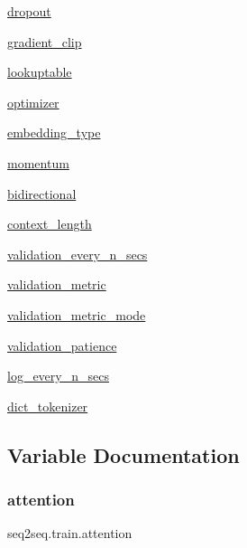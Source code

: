 \begin{DoxyCompactItemize}
\hyperlink{namespaceseq2seq_1_1train_a6ce0f888cec4261959cc61cc80a5cfd4}{dropout}
\item 
\hyperlink{namespaceseq2seq_1_1train_ac8c6c64d90fd2d682a86cdbd893dd895}{gradient\+\_\+clip}
\item 
\hyperlink{namespaceseq2seq_1_1train_a49f7da1b71bd20017774f8c6b8884676}{lookuptable}
\item 
\hyperlink{namespaceseq2seq_1_1train_ab303e1582310ef62604d70c938bfe563}{optimizer}
\item 
\hyperlink{namespaceseq2seq_1_1train_ae607c209cdec45923aaeef6318debcf2}{embedding\+\_\+type}
\item 
\hyperlink{namespaceseq2seq_1_1train_a1714428a81ed90a740bde11d172768ea}{momentum}
\item 
\hyperlink{namespaceseq2seq_1_1train_a84bf6d2d896ec47ce289872a962a71f8}{bidirectional}
\item 
\hyperlink{namespaceseq2seq_1_1train_affd05b2237eb3f4e203a59be06cfc14d}{context\+\_\+length}
\item 
\hyperlink{namespaceseq2seq_1_1train_ad886940ebda001e78047c43e99838fe8}{validation\+\_\+every\+\_\+n\+\_\+secs}
\item 
\hyperlink{namespaceseq2seq_1_1train_a4cb6f12de71de9753db0e582aa95b55c}{validation\+\_\+metric}
\item 
\hyperlink{namespaceseq2seq_1_1train_a06e04c7f720b926c72043de45d55587b}{validation\+\_\+metric\+\_\+mode}
\item 
\hyperlink{namespaceseq2seq_1_1train_aaa30160a61d83c6432812a34488992ee}{validation\+\_\+patience}
\item 
\hyperlink{namespaceseq2seq_1_1train_ace1af0772a478f538d5156ce5758a73a}{log\+\_\+every\+\_\+n\+\_\+secs}
\item 
\hyperlink{namespaceseq2seq_1_1train_a6473fc025953ca7d5207631fd967d865}{dict\+\_\+tokenizer}
\end{DoxyCompactItemize}


\subsection{Variable Documentation}
\mbox{\label{namespaceseq2seq_1_1train_a9fe719271e349a4677bcd56cfa75f9dc}} 
\subsubsection{\texorpdfstring{attention}{attention}}
{\footnotesize\ttfamily seq2seq.\+train.\+attention}



